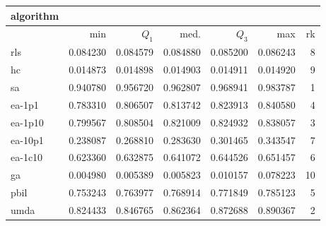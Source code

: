 \begin{tabular}{@{}l*{5}{>{{}}N{1}{3}}>{{}}N{2}{0}@{}}
\toprule
{algorithm} &  \\
\midrule
& {min} & {$Q_1$} & {med.} & {$Q_3$} & {max} & {rk}\\
\midrule
rls & 0.084230 & 0.084579 & 0.084880 & 0.085200 & 0.086243 & 8\\
hc & 0.014873 & 0.014898 & 0.014903 & 0.014911 & 0.014920 & 9\\
sa & {\color{blue}} 0.940780 & {\color{blue}} 0.956720 & {\color{blue}} 0.962807 & {\color{blue}} 0.968941 & {\color{blue}} 0.983787 & 1\\
ea-1p1 & 0.783310 & 0.806507 & 0.813742 & 0.823913 & 0.840580 & 4\\
ea-1p10 & 0.799567 & 0.808504 & 0.821009 & 0.824932 & 0.838057 & 3\\
ea-10p1 & 0.238087 & 0.268810 & 0.283630 & 0.301465 & 0.343547 & 7\\
ea-1c10 & 0.623360 & 0.632875 & 0.641072 & 0.644526 & 0.651457 & 6\\
ga & 0.004980 & 0.005389 & 0.005823 & 0.010157 & 0.078223 & 10\\
pbil & 0.753243 & 0.763977 & 0.768914 & 0.771849 & 0.785123 & 5\\
umda & 0.824433 & 0.846765 & 0.862364 & 0.872688 & 0.890367 & 2\\
\bottomrule
\end{tabular}
